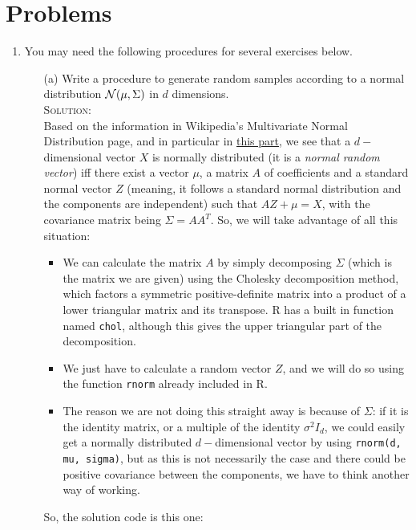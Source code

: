 \documentclass[10pt]{article}
\begin{document}
\section{Problems}
\begin{enumerate}
  \item You may need the following procedures for several exercises below.
  \begin{enumerate}
    \item[(a)] Write a procedure to generate random samples according to a normal distribution $\mathcal N(\boldmath\mu,\boldmath\Sigma)$ in $d$ dimensions.\\
        {\scshape Solution:}\\
        Based on the information in Wikipedia's Multivariate Normal Distribution page, and in particular in \href{https://en.wikipedia.org/wiki/Multivariate_normal_distribution#Normal_random_vector}{this part}, we see that a $d-$dimensional vector $X$ is normally distributed (it is a \textit{normal random vector}) iff there exist a vector $\mu$, a matrix $A$ of coefficients and a standard normal vector $Z$ (meaning, it follows a standard normal distribution and the components are independent) such that $AZ + \mu = X$, with the covariance matrix being $\Sigma=AA^T$. So, we will take advantage of all this situation:
        \begin{itemize}
          \item We can calculate the matrix $A$ by simply decomposing $\Sigma$ (which is the matrix we are given) using the Cholesky decomposition method, which factors a symmetric positive-definite matrix into a product of a lower triangular matrix and its transpose. R has a built in function named \verb|chol|, although this gives the upper triangular part of the decomposition.
          \item We just have to calculate a random vector $Z$, and we will do so using the function \verb|rnorm| already included in R.
          \item The reason we are not doing this straight away is because of $\Sigma$: if it is the identity matrix, or a multiple of the identity $\sigma^2I_d$, we could easily get a normally distributed $d-$dimensional vector by using \verb|rnorm(d, mu, sigma)|, but as this is not necessarily the case and there could be positive covariance between the components, we have to think another way of working.
        \end{itemize}
        So, the solution code is this one:
        \begin{verbatim}

\end{verbatim}
\end{enumerate}
\end{enumerate}
\end{document}
